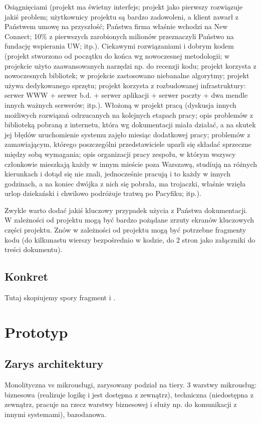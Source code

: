 \documentclass[licencjacka]{pracamgr}
\begin{document}
Osiągnięciami (projekt ma świetny interfejs; projekt jako pierwszy rozwiązuje jakiś problem; użytkownicy projektu są bardzo zadowoleni, a klient zawarł z Państwem umowę na przyszłość; Państwa firma właśnie wchodzi na New Connect; 10\% z pierwszych zarobionych milionów przeznaczyli Państwo na fundację wspierania UW; itp.).
Ciekawymi rozwiązaniami i dobrym kodem (projekt stworzono od początku do końca wg nowoczesnej metodologii; w projekcie użyto zaawansowanych narzędzi np. do recenzji kodu; projekt korzysta z nowoczesnych bibliotek; w projekcie zastosowano niebanalne algorytmy; projekt używa dedykowanego sprzętu; projekt korzysta z rozbudowanej infrastruktury: serwer WWW + serwer b.d. + serwer aplikacji + serwer poczty + dwa mendle innych ważnych serwerów; itp.).
Włożoną w projekt pracą (dyskusja innych możliwych rozwiązań odrzucanych na kolejnych etapach pracy; opis problemów z biblioteką pobraną z internetu, która wg dokumentacji miała działać, a na skutek jej błędów uruchomienie systemu zajęło miesiąc dodatkowej pracy; problemów z zamawiającym, którego poszczególni przedstawiciele uparli się składać sprzeczne między sobą wymagania; opis organizacji pracy zespołu, w którym wszyscy członkowie mieszkają każdy w innym mieście poza Warszawą, studiują na różnych kierunkach i dotąd się nie znali, jednocześnie pracują i to każdy w innych godzinach, a na koniec dwójka z nich się pobrała, ma trojaczki, właśnie wzięła urlop dziekański i chwilowo podróżuje tratwą po Pacyfiku; itp.).

Zwykle warto dodać jakiś kluczowy przypadek użycia z Państwa dokumentacji. W zależności od projektu mogą być bardzo pożądane zrzuty ekranów kluczowych części projektu. Znów w zależności od projektu mogą być potrzebne fragmenty kodu (do kilkunastu wierszy bezpośrednio w kodzie, do 2 stron jako załączniki do treści dokumentu).
\section{Konkret}

Tutaj skopiujemy spory fragment \cite{mcobywatel} i \cite{zuspue}.

\chapter{Prototyp}\label{r:prototyp}

\section{Zarys architektury}
Monolityczna vs mikrousługi, zarysowany podział na tiery.
3 warstwy mikrousług: biznesowa (realizuje logikę i jest dostępna z zewnątrz),
techniczna (niedostępna z zewnątrz, pracuje na rzecz warstwy biznesowej i służy np. do komunikacji
z innymi systemami), bazodanowa.
\end{document}
